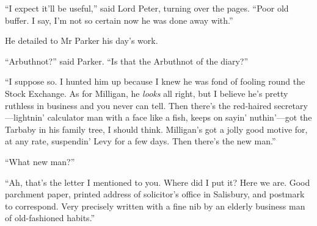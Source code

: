 \enquote{I expect it’ll be useful,} said Lord Peter, turning over the pages. \enquote{Poor old buffer. I say, I’m not so certain now he was done away with.}

He detailed to Mr Parker his day’s work.

\enquote{Arbuthnot?} said Parker. \enquote{Is that the Arbuthnot of the diary?}

\enquote{I suppose so. I hunted him up because I knew he was fond of fooling round the Stock Exchange. As for Milligan, he \textit{looks} all right, but I believe he’s pretty ruthless in business and you never can tell. Then there’s the red-haired secretary\allowbreak---\allowbreak lightnin’ calculator man with a face like a fish, keeps on sayin’ nuthin’---got the Tarbaby in his family tree, I should think. Milligan’s got a jolly good motive for, at any rate, suspendin’ Levy for a few days. Then there’s the new man.}

\enquote{What new man?}

\enquote{Ah, that’s the letter I mentioned to you. Where did I put it? Here we are. Good parchment paper, printed address of solicitor’s office in Salisbury, and postmark to correspond. Very precisely written with a fine nib by an elderly business man of old-fashioned habits.}

